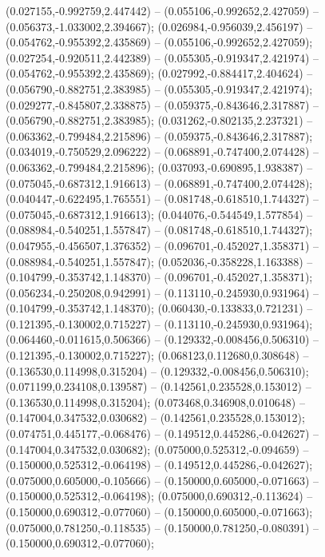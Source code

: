  (0.027155,-0.992759,2.447442) -- (0.055106,-0.992652,2.427059) -- (0.056373,-1.033002,2.394667);
 (0.026984,-0.956039,2.456197) -- (0.054762,-0.955392,2.435869) -- (0.055106,-0.992652,2.427059);
 (0.027254,-0.920511,2.442389) -- (0.055305,-0.919347,2.421974) -- (0.054762,-0.955392,2.435869);
 (0.027992,-0.884417,2.404624) -- (0.056790,-0.882751,2.383985) -- (0.055305,-0.919347,2.421974);
 (0.029277,-0.845807,2.338875) -- (0.059375,-0.843646,2.317887) -- (0.056790,-0.882751,2.383985);
 (0.031262,-0.802135,2.237321) -- (0.063362,-0.799484,2.215896) -- (0.059375,-0.843646,2.317887);
 (0.034019,-0.750529,2.096222) -- (0.068891,-0.747400,2.074428) -- (0.063362,-0.799484,2.215896);
 (0.037093,-0.690895,1.938387) -- (0.075045,-0.687312,1.916613) -- (0.068891,-0.747400,2.074428);
 (0.040447,-0.622495,1.765551) -- (0.081748,-0.618510,1.744327) -- (0.075045,-0.687312,1.916613);
 (0.044076,-0.544549,1.577854) -- (0.088984,-0.540251,1.557847) -- (0.081748,-0.618510,1.744327);
 (0.047955,-0.456507,1.376352) -- (0.096701,-0.452027,1.358371) -- (0.088984,-0.540251,1.557847);
 (0.052036,-0.358228,1.163388) -- (0.104799,-0.353742,1.148370) -- (0.096701,-0.452027,1.358371);
 (0.056234,-0.250208,0.942991) -- (0.113110,-0.245930,0.931964) -- (0.104799,-0.353742,1.148370);
 (0.060430,-0.133833,0.721231) -- (0.121395,-0.130002,0.715227) -- (0.113110,-0.245930,0.931964);
 (0.064460,-0.011615,0.506366) -- (0.129332,-0.008456,0.506310) -- (0.121395,-0.130002,0.715227);
 (0.068123,0.112680,0.308648) -- (0.136530,0.114998,0.315204) -- (0.129332,-0.008456,0.506310);
 (0.071199,0.234108,0.139587) -- (0.142561,0.235528,0.153012) -- (0.136530,0.114998,0.315204);
 (0.073468,0.346908,0.010648) -- (0.147004,0.347532,0.030682) -- (0.142561,0.235528,0.153012);
 (0.074751,0.445177,-0.068476) -- (0.149512,0.445286,-0.042627) -- (0.147004,0.347532,0.030682);
 (0.075000,0.525312,-0.094659) -- (0.150000,0.525312,-0.064198) -- (0.149512,0.445286,-0.042627);
 (0.075000,0.605000,-0.105666) -- (0.150000,0.605000,-0.071663) -- (0.150000,0.525312,-0.064198);
 (0.075000,0.690312,-0.113624) -- (0.150000,0.690312,-0.077060) -- (0.150000,0.605000,-0.071663);
 (0.075000,0.781250,-0.118535) -- (0.150000,0.781250,-0.080391) -- (0.150000,0.690312,-0.077060);
